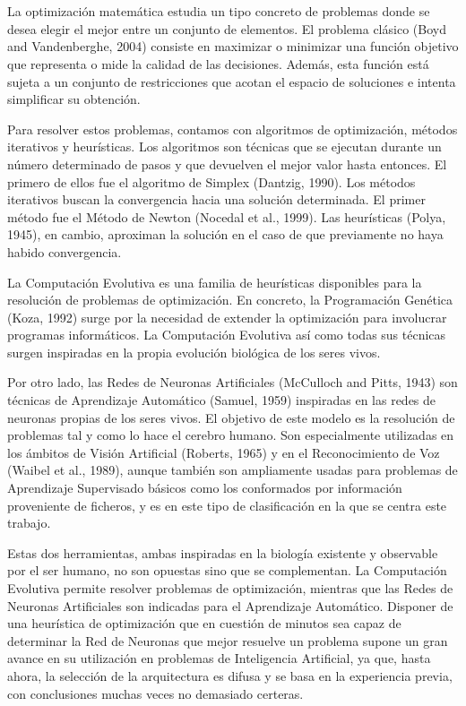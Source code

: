 \documentclass[spanish,a4paper,12pt,twoside]{report}
\begin{document}
  \chapter{\vspace{-3cm}{\LARGE 1. Introducción}}
  \vspace{-1cm}
  La optimización matemática estudia un tipo concreto de problemas donde se desea elegir el mejor entre un conjunto de elementos. El problema clásico (Boyd and Vandenberghe, 2004) consiste en maximizar o minimizar una función objetivo que representa o mide la calidad de las decisiones. Además, esta función está sujeta a un conjunto de restricciones que acotan el espacio de soluciones e intenta simplificar su obtención. \par
  Para resolver estos problemas, contamos con algoritmos de optimización, métodos iterativos y heurísticas. Los algoritmos son técnicas que se ejecutan durante un número determinado de pasos y que devuelven el mejor valor hasta entonces. El primero de ellos fue el algoritmo de Simplex (Dantzig, 1990). Los métodos iterativos buscan la convergencia hacia una solución determinada. El primer método fue el Método de Newton (Nocedal et al., 1999). Las heurísticas (Polya, 1945), en cambio, aproximan la solución en el caso de que previamente no haya habido convergencia. \par
  La Computación Evolutiva es una familia de heurísticas disponibles para la resolución de problemas de optimización. En concreto, la Programación Genética (Koza, 1992) surge por la necesidad de extender la optimización para involucrar programas informáticos. La Computación Evolutiva así como todas sus técnicas surgen inspiradas en la propia evolución biológica de los seres vivos. \par
  Por otro lado, las Redes de Neuronas Artificiales (McCulloch and Pitts, 1943) son técnicas de Aprendizaje Automático (Samuel, 1959) inspiradas en las redes de neuronas propias de los seres vivos. El objetivo de este modelo es la resolución de problemas tal y como lo hace el cerebro humano. Son especialmente utilizadas en los ámbitos de Visión Artificial (Roberts, 1965) y en el Reconocimiento de Voz (Waibel et al., 1989), aunque también son ampliamente usadas para problemas de Aprendizaje Supervisado básicos como los conformados por información proveniente de ficheros, y es en este tipo de clasificación en la que se centra este trabajo. \par
  Estas dos herramientas, ambas inspiradas en la biología existente y observable por el ser humano, no son opuestas sino que se complementan. La Computación Evolutiva permite resolver problemas de optimización, mientras que las Redes de Neuronas Artificiales son indicadas para el Aprendizaje Automático. Disponer de una heurística de optimización que en cuestión de minutos sea capaz de determinar la Red de Neuronas que mejor resuelve un problema supone un gran avance en su utilización en problemas de Inteligencia Artificial, ya que, hasta ahora, la selección de la arquitectura es difusa y se basa en la experiencia previa, con conclusiones muchas veces no demasiado certeras. \par
\end{document}
